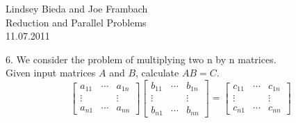 \documentclass[10pt]{article}
\begin{document}
	\begin{flushright}
	Lindsey Bieda and Joe Frambach\\
	Reduction and Parallel Problems\\
	11.07.2011
	\end{flushright}

6. We consider the problem of multiplying two n by n matrices.\\
Given input matrices $A$ and $B$, calculate $AB = C$.\\
\[
\left[ \begin{array}{ccc}
a_{11} & \cdots & a_{1n}\\
\vdots & & \vdots\\
a_{n1} & \cdots & a_{nn}
\end{array} \right]
\left[ \begin{array}{ccc}
b_{11} & \cdots & b_{1n}\\
\vdots & & \vdots\\
b_{n1} & \cdots & b_{nn}
\end{array} \right]
=
\left[ \begin{array}{ccc}
c_{11} & \cdots & c_{1n}\\
\vdots & & \vdots\\
c_{n1} & \cdots & c_{nn}
\end{array} \right]
\]
\\
\end{document}
